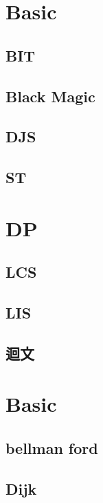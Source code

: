 \section{Basic}
    \subsection{BIT}
        
    \subsection{Black Magic}
        
    \subsection{DJS}
            
    \subsection{ST}
        

\section{DP}
    \subsection{LCS}
        
    \subsection{LIS}
        
    \subsection{迴文}
        

\section{Basic}
    \subsection{bellman ford}
        
    \subsection{Dijk}
        
